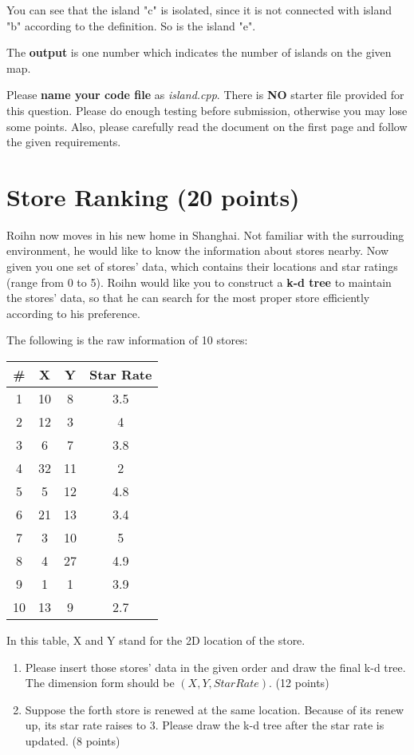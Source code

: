 \documentclass[11pt]{exam}
\begin{document}
You can see that the island "c" is isolated, since it is not connected with island "b" according to the definition. So is the island "e".

The \textbf{output} is one number which indicates the number of islands on the given map.

Please \textbf{name your code file} as \textit{island.cpp}. There is \textbf{NO} starter file provided for this question. Please do enough testing before submission, otherwise you may lose some points. Also, please carefully read the document on the first page and follow the given requirements.

\section{Store Ranking (20 points)}
Roihn now moves in his new home in Shanghai. Not familiar with the surrouding environment, he would like to know the information about stores nearby. Now given you one set of stores' data, which contains their locations and star ratings (range from 0 to 5). Roihn would like you to construct a \textbf{k-d tree} to maintain the stores' data, so that he can search for the most proper store efficiently according to his preference. 

The following is the raw information of 10 stores:
\begin{table}[H]
\centering
\begin{tabular}{c|c|c|c}
\# &X&Y&Star Rate\\
\hline
1&10&8&3.5\\
2&12&3&4\\
3&6&7&3.8\\
4&32&11&2\\
5&5&12&4.8\\
6&21&13&3.4\\
7&3&10&5\\
8&4&27&4.9\\
9&1&1&3.9\\
10&13&9&2.7\\
\end{tabular}
\end{table}

In this table, X and Y stand for the 2D location of the store.
\begin{enumerate}[1.]
\item Please insert those stores' data in the given order and draw the final k-d tree. The dimension form should be $(X, Y, StarRate)$. {\color{red}(12 points)}
\begin{solution}
\end{solution}

\item Suppose the forth store is renewed at the same location. Because of its renew up, its star rate raises to 3. Please draw the k-d tree after the star rate is updated. {\color{red}(8 points)}
\begin{solution}
\end{solution}
\end{enumerate}
\end{document}
